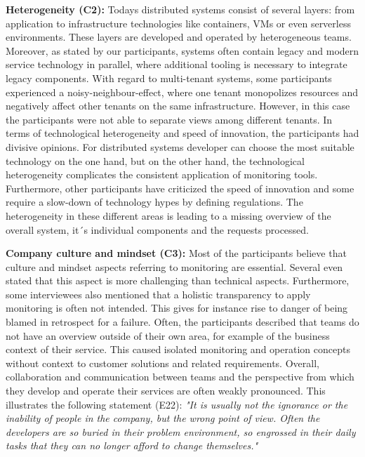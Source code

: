 \documentclass[runningheads]{llncs}
\begin{document}
\textbf{Heterogeneity (C2):}
Todays distributed systems consist of several layers: from  application to infrastructure technologies like containers, VMs or even serverless environments. These layers are developed and operated by heterogeneous teams. Moreover, as stated by our participants, systems often contain legacy and modern service technology in parallel, where additional tooling is necessary to integrate legacy components. With regard to multi-tenant systems, some participants experienced a noisy-neighbour-effect, where one tenant monopolizes resources and negatively affect other tenants on the same infrastructure. However, in this case the participants were not able to separate views among different tenants. In terms of technological heterogeneity and speed of innovation, the participants had divisive opinions. For distributed systems developer can choose the most suitable technology on the one hand, but on the other hand, the technological heterogeneity complicates the consistent application of monitoring tools. Furthermore, other participants have criticized the speed of innovation and some require a slow-down of technology hypes by defining regulations. The heterogeneity in these different areas is leading to a missing overview of the overall system, it´s individual components and the requests processed. 

\textbf{Company culture and mindset (C3):}
Most of the participants believe that culture and mindset aspects referring to monitoring are essential. Several even stated that this aspect is more challenging than technical aspects. Furthermore, some interviewees also mentioned that a holistic transparency to apply monitoring is often not intended. This gives for instance rise to danger of being blamed in retrospect for a failure. Often, the participants described that teams do not have an overview outside of their own area, for example of the business context of their service. This caused isolated monitoring and operation concepts without context to customer solutions and related requirements. Overall, collaboration and communication between teams and the perspective from which they develop and operate their services are often weakly pronounced. This illustrates the following statement (E22): \textit{"It is usually not the ignorance or the inability of people in the company, but the wrong point of view. Often the developers are so buried in their problem environment, so engrossed in their daily tasks that they can no longer afford to change themselves."}
\end{document}
